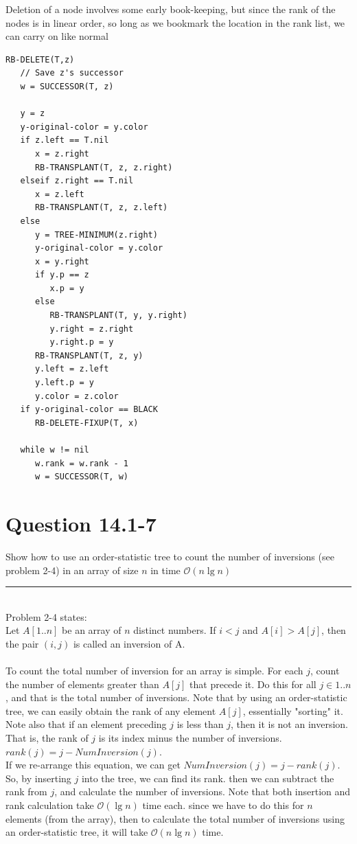 \documentclass[20pt]{article} %
\begin{document}
\newpage
Deletion of a node involves some early book-keeping, but since the rank of the nodes is in linear order, so long as we bookmark the location in the rank list, we can carry on like normal
\begin{verbatim}
RB-DELETE(T,z)
   // Save z's successor
   w = SUCCESSOR(T, z)

   y = z
   y-original-color = y.color
   if z.left == T.nil
      x = z.right
      RB-TRANSPLANT(T, z, z.right)
   elseif z.right == T.nil
      x = z.left
      RB-TRANSPLANT(T, z, z.left)
   else 
      y = TREE-MINIMUM(z.right)
      y-original-color = y.color
      x = y.right
      if y.p == z
         x.p = y
      else
         RB-TRANSPLANT(T, y, y.right)
         y.right = z.right
         y.right.p = y
      RB-TRANSPLANT(T, z, y)
      y.left = z.left
      y.left.p = y
      y.color = z.color
   if y-original-color == BLACK
      RB-DELETE-FIXUP(T, x)

   while w != nil
      w.rank = w.rank - 1
      w = SUCCESSOR(T, w)

\end{verbatim}

\newpage
\section{Question 14.1-7}
Show how to use an order-statistic tree to count the number of inversions (see problem 2-4) in an array of size $n$ in time $\mathcal{O}(n \lg n)$  \\ 
\noindent\rule{2cm}{0.4pt} \\

Problem 2-4 states: \\
Let $A[1..n]$ be an array of $n$ distinct numbers. If $i < j$ and $A[i] > A[j]$, then the pair $(i,j)$ is called an inversion of A. \\ \\

To count the total number of inversion for an array is simple.  For each $j$, count the number of elements greater than $A[j]$ that precede it.  Do this for all $j \in 1..n$, and that is the total number of inversions.  Note that by using an order-statistic tree, we can easily obtain the rank of any element $A[j]$, essentially "sorting" it.  Note also that if an element preceding $j$ is less than $j$, then it is not an inversion. That is, the rank of $j$ is its index minus the number of inversions. $rank(j) = j - NumInversion(j)$. \\

If we re-arrange this equation, we can get $NumInversion(j) = j - rank(j)$. So, by inserting $j$ into the tree, we can find its rank. then we can subtract the rank from $j$, and calculate the number of inversions. Note that both insertion and rank calculation take $\mathcal{O}(\lg n)$ time each. since we have to do this for $n$ elements (from the array), then to calculate the total number of inversions using an order-statistic tree, it will take  $\mathcal{O}(n \lg n)$ time.
\end{document}
